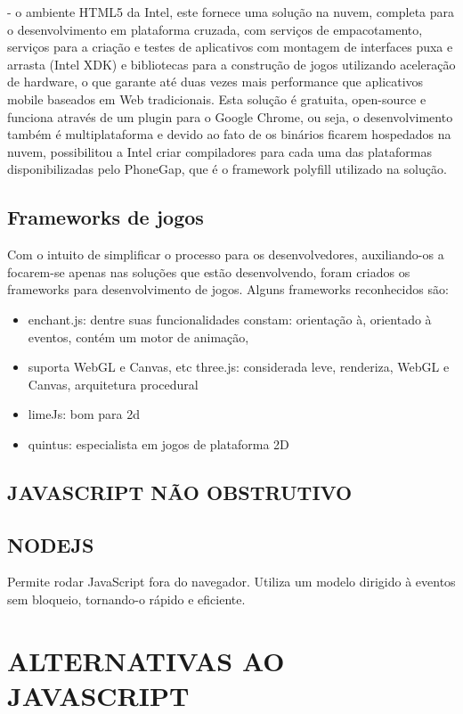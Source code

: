 \documentclass[
12pt,
a4paper,
portuges,
draft
]{report}
\begin{document}
    - o ambiente HTML5 da Intel, este fornece uma solução na nuvem,
completa para o desenvolvimento em plataforma cruzada, com serviços de
empacotamento, serviços para a criação e testes de aplicativos com
montagem de interfaces puxa e arrasta (Intel XDK) e bibliotecas para a
construção de jogos utilizando aceleração de hardware, o que garante
até duas vezes mais performance que aplicativos mobile baseados em
Web tradicionais. Esta solução é gratuita, open-source e funciona
através de um plugin para o Google Chrome, ou seja, o desenvolvimento
também é multiplataforma e devido ao fato de os binários ficarem
hospedados na nuvem, possibilitou a Intel criar compiladores para cada
uma das plataformas disponibilizadas pelo PhoneGap, que é o framework
polyfill utilizado na solução.

\section{Frameworks de jogos}

Com o intuito de simplificar o processo para os desenvolvedores,
auxiliando-os a focarem-se apenas nas soluções que estão
desenvolvendo, foram criados os frameworks para desenvolvimento de
jogos. Alguns frameworks reconhecidos são:

\begin{itemize}
\item enchant.js: dentre suas funcionalidades constam: orientação à, orientado à eventos, contém um motor de animação,
\item suporta WebGL e Canvas, etc three.js: considerada leve, renderiza, WebGL e Canvas, arquitetura procedural
\item limeJs: bom para 2d
\item quintus: especialista em jogos de plataforma 2D
\end{itemize}

\section{JAVASCRIPT NÃO OBSTRUTIVO}

\section{NODEJS}

Permite rodar JavaScript fora do navegador. Utiliza um modelo dirigido
à eventos sem bloqueio, tornando-o rápido e eficiente.

\chapter{ALTERNATIVAS AO JAVASCRIPT}
\end{document}
